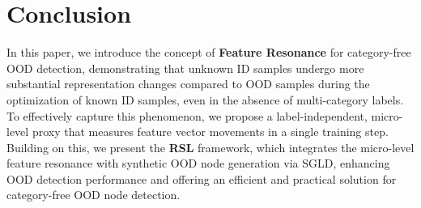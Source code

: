 \section{Conclusion}
\label{Sec-Conclusion}





In this paper, we introduce the concept of \textbf{Feature Resonance} for category-free OOD detection, demonstrating that unknown ID samples undergo more substantial representation changes compared to OOD samples during the optimization of known ID samples, even in the absence of multi-category labels. To effectively capture this phenomenon, we propose a label-independent, micro-level proxy that measures feature vector movements in a single training step. Building on this, we present the \textbf{RSL} framework, which integrates the micro-level feature resonance with synthetic OOD node generation via SGLD, enhancing OOD detection performance and offering an efficient and practical solution for category-free OOD node detection.